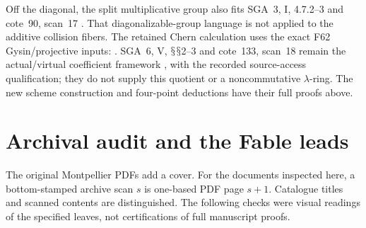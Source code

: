 \documentclass[11pt,a4paper]{article}
\renewcommand{\S}{\ensuremath{\mathsection}}
\newcommand{\fid}[1]{\textsf{#1}}\newcommand{\gate}[1]{\textsf{#1}}
\theoremstyle{named}\newtheorem{finding}{Finding}[section]
\theoremstyle{definition}\newtheorem{definition}[finding]{Definition}
\theoremstyle{remark}\newtheorem{remark}[finding]{Remark}
\begin{document}
Off the diagonal, the split multiplicative group
also fits SGA~3, I, 4.7.2--3 and cote~90,
scan~17 \cite{SGA3,Archive}.
That diagonalizable-group language is not applied
to the additive collision fibers.
The retained Chern calculation uses the exact
\fid{F62} Gysin/projective inputs:
\cite[Theorem~16.1 and Corollary~16.2, p.~108;
Theorem~23.2, pp.~139--140]{Milne}.
SGA~6, V, \S\S2--3 and cote~133, scan~18
remain the actual/virtual coefficient framework
\cite{SGA6,Archive}, with the recorded source-access
qualification; they do not supply this quotient
or a noncommutative \(\lambda\)-ring.
The new scheme construction and four-point
deductions have their full proofs above.

\section{Archival audit and the Fable leads}\label{sec:archive}
The original Montpellier PDFs add a cover. For the documents inspected here, a bottom-stamped archive scan $s$ is one-based PDF page $s+1$. Catalogue titles and scanned contents are distinguished. The following checks were visual readings of the specified leaves, not certifications of full manuscript proofs.
\end{document}
